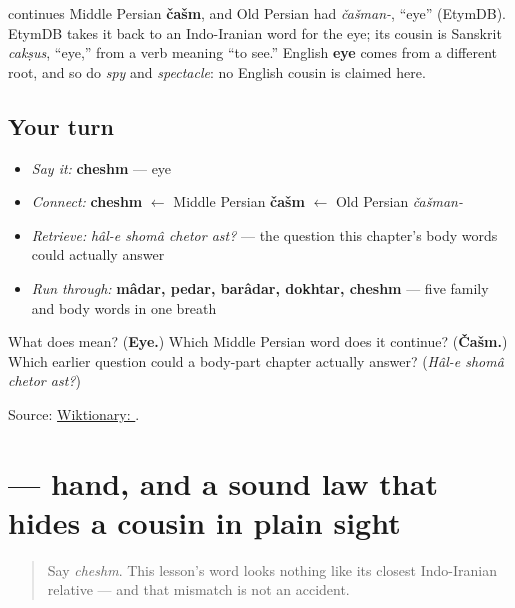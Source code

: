 \begin{cousinweb}
\textbf{} continues Middle Persian \textbf{čašm}, and Old Persian had \emph{čašman-}, “eye” (EtymDB). EtymDB takes it back to an Indo-Iranian word for the eye; its cousin is Sanskrit \emph{cakṣus}, “eye,” from a verb meaning “to see.” English \textbf{eye} comes from a different root, and so do \emph{spy} and \emph{spectacle}: no English cousin is claimed here.
\end{cousinweb}

\subsection*{Your turn}
\begin{itemize}
\raggedright
  \item \emph{Say it:} \textbf{cheshm} — eye
  \item \emph{Connect:} \textbf{cheshm} $\leftarrow$ Middle Persian \textbf{čašm} $\leftarrow$ Old Persian \emph{čašman-}
  \item \emph{Retrieve:} \emph{hâl-e shomâ chetor ast?} — the question this chapter's body words could actually answer
  \item \emph{Run through:} \textbf{mâdar, pedar, barâdar, dokhtar, cheshm} — five family and body words in one breath
\end{itemize}

\begin{tcolorbox}[breakable,colback=teal!4,colframe=teal!35!black,title={Before you move on}]
What does \textbf{} mean? (\textbf{Eye.}) Which Middle Persian word does it continue? (\textbf{Čašm.}) Which earlier question could a body-part chapter actually answer? (\emph{Hâl-e shomâ chetor ast?})

Source: \href{https://en.wiktionary.org/wiki/\%DA\%86\%D8\%B4\%D9\%85}{Wiktionary: }.
\end{tcolorbox}
\section[\texorpdfstring{\fa{دست} (dast)}{دست (dast)}]{ — hand, and a sound law that hides a cousin in plain sight}

\label{lesson:FA-C11-dast}



\begin{quote}
Say \emph{cheshm}. This lesson's word looks nothing like its closest Indo-Iranian relative — and that mismatch is not an accident.
\end{quote}

